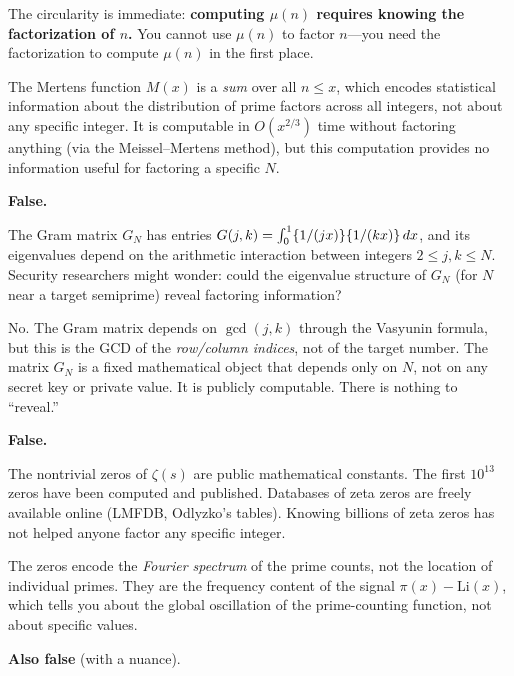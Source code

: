 \documentclass[11pt,a4paper]{article}
\begin{document}
The circularity is immediate: \textbf{computing $\mu(n)$ requires
knowing the factorization of $n$.} You cannot use $\mu(n)$ to factor
$n$---you need the factorization to compute $\mu(n)$ in the first
place.

The Mertens function $M(x)$ is a \emph{sum} over all $n \leq x$,
which encodes statistical information about the distribution of
prime factors across all integers, not about any specific integer.
It is computable in $O(x^{2/3})$ time without factoring anything
(via the Meissel--Mertens method), but this computation provides no
information useful for factoring a specific $N$.

\begin{myth}
\label{myth:gram}
\textbf{False.}
\end{myth}

The Gram matrix $G_N$ has entries
$G(j,k) = \int_0^1 \{1/(jx)\} \{1/(kx)\}\,dx$, and its
eigenvalues depend on the arithmetic interaction between integers
$2 \leq j, k \leq N$. Security researchers might wonder: could the
eigenvalue structure of $G_N$ (for $N$ near a target semiprime)
reveal factoring information?

No. The Gram matrix depends on $\gcd(j,k)$ through the Vasyunin
formula, but this is the GCD of the \emph{row/column indices}, not
of the target number. The matrix $G_N$ is a fixed mathematical
object that depends only on $N$, not on any secret key or private
value. It is publicly computable. There is nothing to ``reveal.''

\begin{myth}
\label{myth:zeros}
\textbf{False.}
\end{myth}

The nontrivial zeros of $\zeta(s)$ are public mathematical constants.
The first $10^{13}$ zeros have been computed and published. Databases
of zeta zeros are freely available online (LMFDB, Odlyzko's tables).
Knowing billions of zeta zeros has not helped anyone factor any
specific integer.

The zeros encode the \emph{Fourier spectrum} of the prime counts,
not the location of individual primes. They are the frequency
content of the signal $\pi(x) - \text{Li}(x)$, which tells you
about the global oscillation of the prime-counting function, not
about specific values.

\begin{myth}
\label{myth:disproof}
\textbf{Also false} (with a nuance).
\end{myth}
\end{document}
